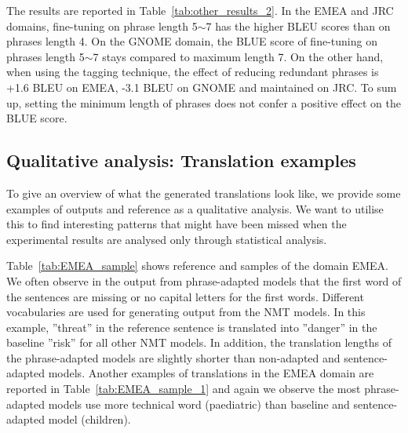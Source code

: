 The results are reported in Table~\ref{tab:other_results_2}. In the EMEA and JRC domains, fine-tuning on phrase length 5$\sim$7 has the higher BLEU scores than on phrases length 4. On the GNOME domain, the BLUE score of fine-tuning on phrases length 5$\sim$7 stays compared to maximum length 7. On the other hand, when using the tagging technique, the effect of reducing redundant phrases is +1.6 BLEU on EMEA, -3.1 BLEU on GNOME and maintained on JRC. To sum up, setting the minimum length of phrases does not confer a positive effect on the BLUE score.




\subsection{Qualitative analysis: Translation examples} %

To give an overview of what the generated translations look like, we provide some examples of outputs and reference as a qualitative analysis. We want to utilise this to find interesting patterns that might have been missed when the experimental results are analysed only through statistical analysis.

Table~\ref{tab:EMEA_sample} shows reference and samples of the domain EMEA. We often observe in the output from phrase-adapted models that the first word of the sentences are missing or no capital letters for the first words. %
Different vocabularies are used for generating output from the NMT models. In this example, ''threat'' in the reference sentence is translated into ''danger'' in the baseline ''risk'' for all other NMT models. In addition, the translation lengths of the phrase-adapted models are slightly shorter than non-adapted and sentence-adapted models. Another examples of translations in the EMEA domain are reported in Table~\ref{tab:EMEA_sample_1} and again we observe the most phrase-adapted models use more technical word (paediatric) than baseline and sentence-adapted model (children).

